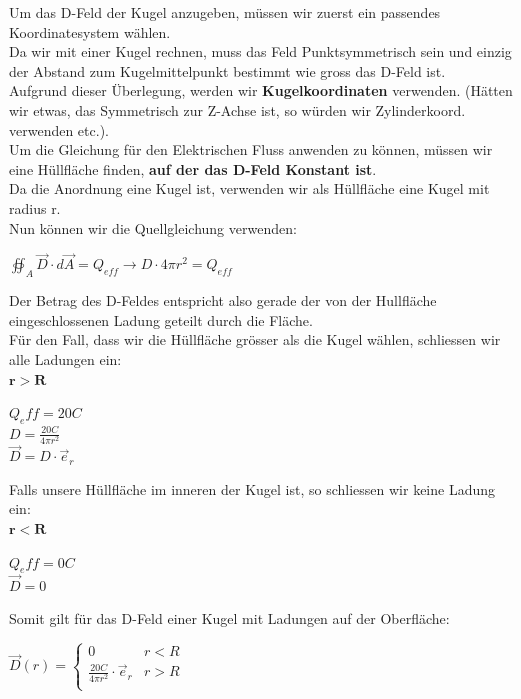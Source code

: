 \beginbsp
Um das D-Feld der Kugel anzugeben, müssen wir zuerst ein passendes Koordinatesystem wählen. \\
Da wir mit einer Kugel rechnen, muss das Feld Punktsymmetrisch sein und einzig der Abstand zum Kugelmittelpunkt bestimmt wie gross das D-Feld ist. \\
Aufgrund dieser Überlegung, werden wir \textbf{Kugelkoordinaten} verwenden. (Hätten wir etwas, das Symmetrisch zur Z-Achse ist, so würden wir Zylinderkoord. verwenden etc.). \\
Um die Gleichung für den Elektrischen Fluss anwenden zu können, müssen wir eine Hüllfläche finden,   \textbf{auf der das D-Feld Konstant ist}. \\
Da die Anordnung eine Kugel ist, verwenden wir als Hüllfläche eine Kugel mit radius r. \\
Nun können wir die Quellgleichung verwenden:
\begin{center}
	$ \oiint_A \vec{D}\cdot d\vec{A} = Q_{eff} \rightarrow D \cdot  4\pi r^2  = Q_{eff} $
\end{center}
Der Betrag des D-Feldes entspricht also gerade der von der Hullfläche eingeschlossenen Ladung geteilt durch die Fläche. \\
Für den Fall, dass wir die Hüllfläche grösser als die Kugel wählen, schliessen wir alle Ladungen ein: \\
$\mathbf{r > R}$ \\
\begin{center}
	$Q_eff = 20C$ \\
	$D = \frac{20C}{4\pi r^2}$ \\
	$\vec{D} = D \cdot \vec{e}_r$
\end{center}

Falls unsere Hüllfläche im inneren der Kugel ist, so schliessen wir keine Ladung ein: \\
$\mathbf{r < R}$ \\
\begin{center}
	$Q_eff = 0C$ \\
	$\vec{D} = 0$
\end{center}

Somit gilt für das D-Feld einer Kugel mit Ladungen auf der Oberfläche: \\
\begin{center}

	$
	\vec{D}(r) =
	\begin{cases}
		0                                       & r < R \\
		\frac{20 C}{4 \pi r^2} \cdot  \vec{e}_r & r > R \\
	\end{cases}$

\end{center}
\iend





